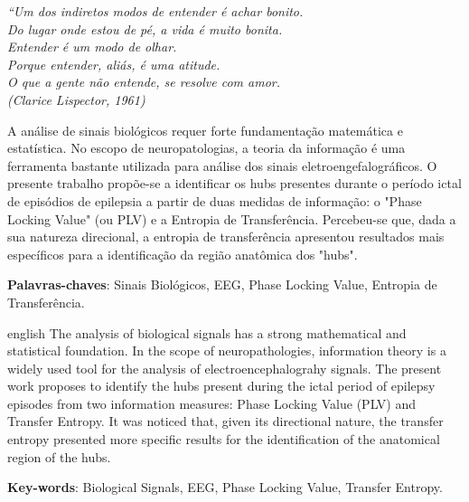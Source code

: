 \documentclass[
	12pt,				%
	openright,			%
	twoside,			%
	a4paper,			%
	english,			%
	french,				%
	spanish,			%
	brazil				%
	]{abntex2}
\begin{document}
\begin{epigrafe}
    \vspace*{\fill}
	\begin{flushright}
		\textit{``Um dos indiretos modos de entender é achar bonito. \\
Do lugar onde estou de pé, a vida é muito bonita. \\
Entender é um modo de olhar. 
\\ Porque entender, aliás, é uma atitude. 
\\ O que a gente não entende, se resolve com amor.\\
(Clarice Lispector, 1961)}
	\end{flushright}
\end{epigrafe}


\setlength{\absparsep}{18pt} %
\begin{resumo}
 
 A análise de sinais biológicos requer forte fundamentação matemática e estatística. No escopo de neuropatologias, a teoria da informação é uma ferramenta bastante utilizada para análise dos sinais eletroengefalográficos. O presente trabalho propõe-se a identificar os hubs presentes durante o período ictal de episódios de epilepsia a partir de duas medidas de informação: o "Phase Locking Value" (ou PLV) e a Entropia de Transferência. Percebeu-se que, dada a sua natureza direcional, a entropia de transferência apresentou resultados mais específicos para a identificação da região anatômica dos "hubs".
 
 

 \textbf{Palavras-chaves}: Sinais Biológicos, EEG, Phase Locking Value, Entropia de Transferência.
\end{resumo}

\begin{resumo}[Abstract]
 \begin{otherlanguage*}{english}
  The analysis of biological signals has a strong mathematical and statistical foundation. In the scope of neuropathologies, information theory is a widely used tool for the analysis of electroencephalograhy signals. The present work proposes to identify the hubs present during the ictal period of epilepsy episodes from two information measures: Phase Locking Value (PLV) and Transfer Entropy. It was noticed that, given its directional nature, the transfer entropy presented more specific results for the identification of the anatomical region of the hubs.

   \vspace{\onelineskip}
 
   \noindent 
   \textbf{Key-words}: Biological Signals, EEG, Phase Locking Value, Transfer Entropy.
 \end{otherlanguage*}
\end{resumo}
\end{document}
